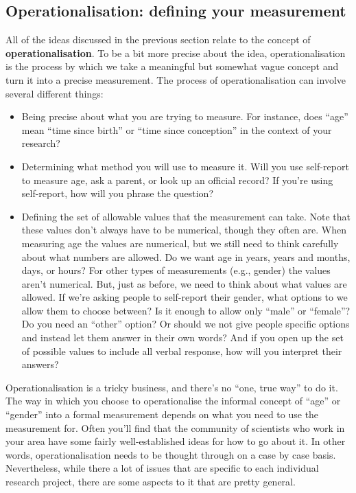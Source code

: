 \documentclass[
  letterpaper,
]{book}
\begin{document}
\hypertarget{operationalisation-defining-your-measurement}{%
\subsection{Operationalisation: defining your
measurement}\label{operationalisation-defining-your-measurement}}

All of the ideas discussed in the previous section relate to the concept
of \textbf{operationalisation}. To be a bit more precise about the idea,
operationalisation is the process by which we take a meaningful but
somewhat vague concept and turn it into a precise measurement. The
process of operationalisation can involve several different things:

\begin{itemize}
\item
  Being precise about what you are trying to measure. For instance, does
  ``age'' mean ``time since birth'' or ``time since conception'' in the
  context of your research?
\item
  Determining what method you will use to measure it. Will you use
  self-report to measure age, ask a parent, or look up an official
  record? If you're using self-report, how will you phrase the question?
\item
  Defining the set of allowable values that the measurement can take.
  Note that these values don't always have to be numerical, though they
  often are. When measuring age the values are numerical, but we still
  need to think carefully about what numbers are allowed. Do we want age
  in years, years and months, days, or hours? For other types of
  measurements (e.g., gender) the values aren't numerical. But, just as
  before, we need to think about what values are allowed. If we're
  asking people to self-report their gender, what options to we allow
  them to choose between? Is it enough to allow only ``male'' or
  ``female''? Do you need an ``other'' option? Or should we not give
  people specific options and instead let them answer in their own
  words? And if you open up the set of possible values to include all
  verbal response, how will you interpret their answers?
\end{itemize}

Operationalisation is a tricky business, and there's no ``one, true
way'' to do it. The way in which you choose to operationalise the
informal concept of ``age'' or ``gender'' into a formal measurement
depends on what you need to use the measurement for. Often you'll find
that the community of scientists who work in your area have some fairly
well-established ideas for how to go about it. In other words,
operationalisation needs to be thought through on a case by case basis.
Nevertheless, while there a lot of issues that are specific to each
individual research project, there are some aspects to it that are
pretty general.
\end{document}
